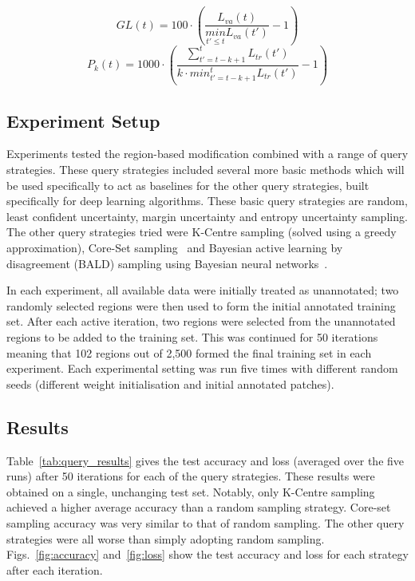 \begin{equation}
	GL(t) = 100 \cdot \left ( \frac{L_{va}(t)}{\underset{t'\leq t}{min}L_{va}(t')} - 1 \right )
	\label{eq:generalization_loss}
\end{equation}
\begin{equation}
	P_k(t) = 1000 \cdot \left ( \frac{\sum_{t'=t-k+1}^{t}L_{tr}(t')}{k \cdot min^{t}_{t'=t-k+1}L_{tr}(t')} - 1\right )
	\label{eq:training_progression}
\end{equation}

\subsection{Experiment Setup}
Experiments tested the region-based modification combined with a range of query strategies. These query strategies included several more basic methods which will be used specifically to act as baselines for the other query strategies, built specifically for deep learning algorithms. These basic query strategies are random, least confident uncertainty, margin uncertainty and entropy uncertainty sampling. The other query strategies tried were K-Centre sampling (solved using a greedy approximation), Core-Set sampling~\cite{sener2018active} and Bayesian active learning by disagreement (BALD) sampling using Bayesian neural networks~\cite{gal2017deep}. 

In each experiment, all available data were initially treated as unannotated; two randomly selected regions were then used to form the initial annotated training set. After each active iteration, two regions were selected from the unannotated regions to be added to the training set. This was continued for 50 iterations meaning that 102 regions out of 2,500 formed the final training set in each experiment. Each experimental setting was run five times with different random seeds (different weight initialisation and initial annotated patches). 

\subsection{Results}
Table~\ref{tab:query_results} gives the test accuracy and loss (averaged over the five runs) after 50 iterations for each of the query strategies. These results were obtained on a single, unchanging test set. Notably, only K-Centre sampling achieved a higher average accuracy than a random sampling strategy. Core-set sampling accuracy was very similar to that of random sampling. The other query strategies were all worse than simply adopting random sampling. Figs.~\ref{fig:accuracy} and~\ref{fig:loss} show the test accuracy and loss for each strategy after each iteration. 

